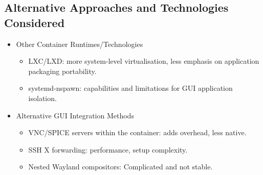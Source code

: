 \documentclass[journal,onecolumn]{IEEEtran}
\begin{document}
\subsection{Alternative Approaches and Technologies Considered}
\begin{itemize}
    \item Other Container Runtimes/Technologies
    \begin{itemize}
        \item LXC/LXD: more system-level virtualisation, less emphasis on application packaging portability.
        \item systemd-nspawn: capabilities and limitations for GUI application isolation.
    \end{itemize}
    \item Alternative GUI Integration Methods
    \begin{itemize}
        \item VNC/SPICE servers within the container: adds overhead, less native.
        \item SSH X forwarding: performance, setup complexity.
        \item Nested Wayland compositors: Complicated and not stable.
    \end{itemize}
\end{itemize}
\end{document}
